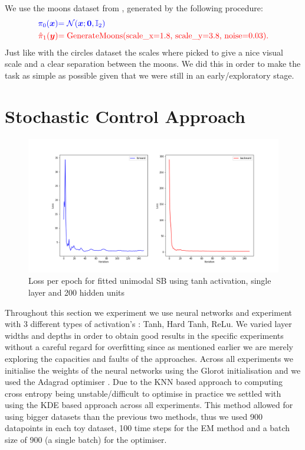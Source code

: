 \documentclass[a4paper,12pt,twoside,openright]{report}
\theoremstyle{definition}
\begin{document}
We use the moons dataset from \cite{pedregosa2011scikit}, generated by the following procedure:
\begin{align*}
     \color{blue}{\pi_0({\bm{x}})} &\color{blue}{= {\mathcal{N}}({\bm{x}}; {\bm{0}},  \mathbb{I}_2)} \\
    \color{red}{\hat{\pi}_1({\bm{y}})} &\color{red}{= \text{GenerateMoons(scale\_x=1.8, scale\_y=3.8, noise=0.03)}}.
\end{align*}
Just like with the circles dataset the scales where picked to give a nice visual scale and a clear separation between the moons. We did this in order to make the task as simple as possible given that we were still in an early/exploratory stage.


\section{Stochastic Control Approach}
\begin{figure}
    \centering
    \includegraphics[scale=0.4,trim={2.3cm 1cm 2.5cm 0}, clip]{images/Control/big_var_loss.png}
    \caption{Loss per epoch for fitted unimodal SB using tanh activation, single layer and 200 hidden units}
    \label{fig:epochsbigvarnn}
\end{figure}
Throughout this section we experiment we use neural networks \citep{lecun2015deep} and experiment with 3 different types of activation's : Tanh, Hard Tanh, ReLu.  We varied layer widths and depths in order  to obtain good results in the specific experiments without a careful regard for overfitting since as mentioned earlier we are merely exploring the capacities and faults of the approaches. Across all experiments we initialise the weights of the neural networks using the Glorot initialisation \citep{glorot2010understanding} and we used the Adagrad optimiser \citep{duchi2011adaptive}. Due to the KNN based approach to computing cross entropy being unstable/difficult to optimise in practice we settled with using the KDE based approach across all experiments. This method allowed for using bigger datasets than the previous two methods, thus we used 900 datapoints in each toy dataset, 100 time steps for the EM method and a batch size of 900 (a single batch) for the optimiser. 
\end{document}
